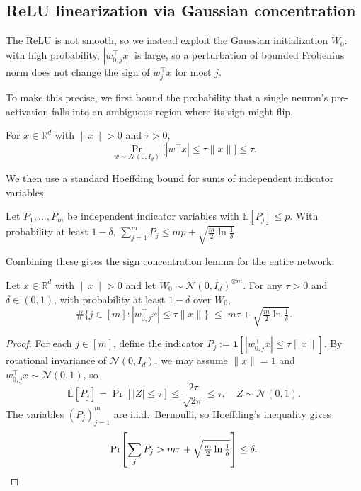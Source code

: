 \subsection{ReLU linearization via Gaussian concentration}

The ReLU is not smooth, so we instead exploit the Gaussian initialization $W_0$:
with high probability, $|w_{0,j}^\top x|$ is large, so a perturbation of bounded
Frobenius norm does not change the sign of $w_j^\top x$ for most $j$.

To make this precise, we first bound the probability that a single neuron's pre-activation falls into an ambiguous region where its sign might flip.

\begin{lemma}\label{lem:ntk:probSignAmbiguous}
  \leanok
For $x \in \mathbb{R}^d$ with $\|x\| > 0$ and $\tau > 0$,
\[
  \Pr_{w \sim \mathcal{N}(0, I_d)}\!\bigl[ |w^\top x| \le \tau\|x\| \bigr] \le \tau.
\]
\end{lemma}

We then use a standard Hoeffding bound for sums of independent indicator variables:

\begin{lemma}\label{lem:ntk:hoeffding}
  \leanok
Let $P_1, \ldots, P_m$ be independent indicator variables with $\mathbb{E}[P_j] \le p$.
With probability at least $1-\delta$, $\sum_{j=1}^m P_j \le mp + \sqrt{\frac{m}{2}\ln\frac{1}{\delta}}$.
\end{lemma}

Combining these gives the sign concentration lemma for the entire network:

\begin{lemma}\label{lem:ntk:signConcentration}
  \leanok
Let $x \in \mathbb{R}^d$ with $\|x\| > 0$ and let $W_0 \sim \mathcal{N}(0, I_d)^{\otimes m}$.
For any $\tau > 0$ and $\delta \in (0, 1)$, with probability at least $1 - \delta$ over $W_0$,
\[
  \#\!\bigl\{j \in [m] : |w_{0,j}^\top x| \le \tau\|x\|\bigr\}
  \;\le\; m\tau + \sqrt{\tfrac{m}{2} \ln \tfrac{1}{\delta}}.
\]
\end{lemma}

\begin{proof}
  \leanok
For each $j \in [m]$, define the indicator $P_j := \mathbf{1}[|w_{0,j}^\top x| \le \tau\|x\|]$.
By rotational invariance of $\mathcal{N}(0,I_d)$, we may assume $\|x\| = 1$ and
$w_{0,j}^\top x \sim \mathcal{N}(0,1)$, so
\[
  \mathbb{E}[P_j] = \Pr[|Z| \le \tau] \le \frac{2\tau}{\sqrt{2\pi}} \le \tau, \quad Z \sim \mathcal{N}(0,1).
\]
The variables $(P_j)_{j=1}^m$ are i.i.d.\ Bernoulli, so Hoeffding's inequality gives
\[
  \Pr\!\left[\sum_j P_j > m\tau + \sqrt{\tfrac{m}{2}\ln\tfrac{1}{\delta}}\right] \le \delta. \qedhere
\]
\end{proof}

